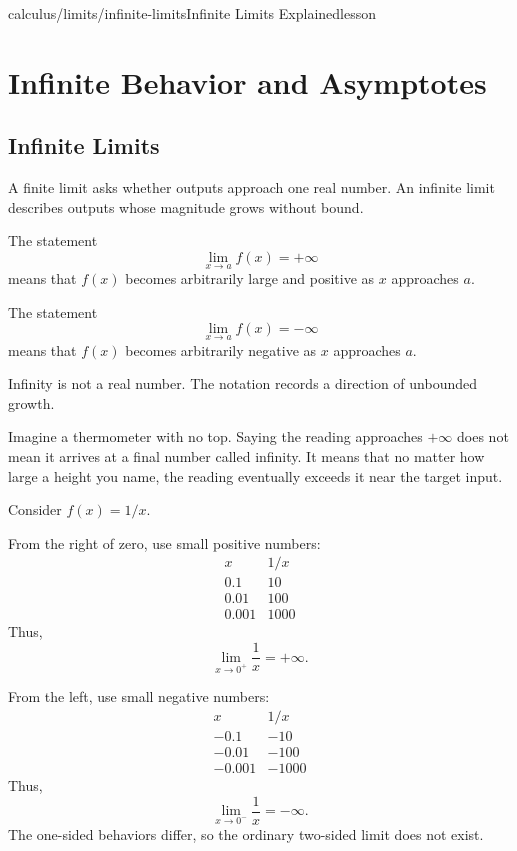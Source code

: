 \begin{webpage}{calculus/limits/infinite-limits}{Infinite Limits Explained}{lesson}
\chapter{Infinite Behavior and Asymptotes}

\section{Infinite Limits}


A finite limit asks whether outputs approach one real number. An infinite limit describes outputs whose magnitude grows without bound.

\begin{bgdefinition}[title={Infinite-Limit Notation}]
The statement
\[
  \lim_{x\to a}f(x)=+\infty
\]
means that \(f(x)\) becomes arbitrarily large and positive as \(x\) approaches \(a\).

The statement
\[
  \lim_{x\to a}f(x)=-\infty
\]
means that \(f(x)\) becomes arbitrarily negative as \(x\) approaches \(a\).
\end{bgdefinition}

Infinity is not a real number. The notation records a direction of unbounded growth.

\begin{bgconcept}
Imagine a thermometer with no top. Saying the reading approaches \(+\infty\) does not mean it arrives at a final number called infinity. It means that no matter how large a height you name, the reading eventually exceeds it near the target input.
\end{bgconcept}

\begin{bgguided}[title={\(1/x\) near zero}]
Consider \(f(x)=1/x\).

From the right of zero, use small positive numbers:
\[
\begin{array}{c|c}
x&1/x\\
\hline
0.1&10\\
0.01&100\\
0.001&1000
\end{array}
\]
Thus,
\[
  \lim_{x\to0^+}\frac1x=+\infty.
\]

From the left, use small negative numbers:
\[
\begin{array}{c|c}
x&1/x\\
\hline
-0.1&-10\\
-0.01&-100\\
-0.001&-1000
\end{array}
\]
Thus,
\[
  \lim_{x\to0^-}\frac1x=-\infty.
\]
The one-sided behaviors differ, so the ordinary two-sided limit does not exist.
\end{bgguided}


\end{webpage}
